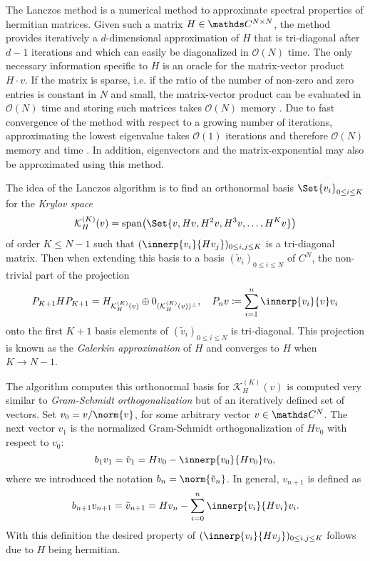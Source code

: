 The Lanczos method is a numerical method to approximate spectral properties of hermitian matrices. 
Given such a matrix \(H \in \C^{N\times N}\), the method provides iteratively a \(d\)-dimensional approximation of \(H\) that is tri-diagonal after \(d-1\) iterations and which can easily be diagonalized in \(\mathcal{O}(N)\) time.
The only necessary information specific to \(H\) is an oracle for the matrix-vector product \(H\cdot v\).
If the matrix is sparse, i.e. if the ratio of the number of non-zero and zero entries is constant in \(N\) and small, the matrix-vector product can be evaluated in \(\mathcal{O}(N)\) time and storing such matrices takes \(\mathcal{O}(N)\) memory \cite{kocherikLanczosMethod2015}. 
Due to fast convergence of the method with respect to a growing number of iterations, approximating the lowest eigenvalue takes \(\mathcal{O}(1)\) iterations and therefore \(\mathcal{O}(N)\) memory and time \cite{kocherikLanczosMethod2015}.
In addition, eigenvectors and the matrix-exponential may also be approximated using this method. 

The idea of the Lanczos algorithm is to find an orthonormal basis \(\Set{v_i}_{0\leq i \leq K}\) for the \emph{Krylov space}
\begin{equation}
    \mathcal{K}^{(K)}_H(v) = \vecspan\of*{\Set{v, Hv, H^2v, H^3v, \dots, H^K v}}
\end{equation}
of order \(K \leq N-1\) such that \((\innerp{v_i}{H v_j})_{0 \leq i,j \leq K}\) is a tri-diagonal matrix. 
Then when extending this basis to a basis \((\tilde v_i)_{0\leq i \leq N}\) of \(C^N\), the non-trivial part of the projection 
\begin{equation}
    P_{K+1} H P_{K+1} = H_{\mathcal{K}^{(K)}_H(v)} \oplus 0_{(\mathcal{K}^{(K)}_H(v))^\perp}, \quad P_n v \coloneq \sum_{i=1}^n \innerp{v_i}{v} v_i
\end{equation}
onto the first \(K+1\) basis elements of \((\tilde{v}_i)_{0\leq i \leq N}\) is tri-diagonal. 
This projection is known as the \emph{Galerkin approximation} of \(H\) and converges to \(H\) when \(K \to N-1\).

The algorithm computes this orthonormal basis for \(\mathcal{K}^{(K)}_H(v)\) is computed very similar to \emph{Gram-Schmidt orthogonalization} but of an iteratively defined set of vectors. 
Set \(v_0 = v / \norm{v}\), for some arbitrary vector \(v\in\C^N\). 
The next vector \(v_1\) is the normalized Gram-Schmidt orthogonalization of \(H v_0\) with respect to \(v_0\):
\begin{equation}
    b_1 v_1 = \tilde v_1 = H v_0 - \innerp{v_0}{H v_0} v_0
    ,
\end{equation}
where we introduced the notation \(b_n = \norm{\tilde v_n}\).
In general, \(v_{n+1}\) is defined as 
\begin{equation}
    b_{n+1} v_{n+1} = \tilde v_{n+1} = H v_n - \sum_{i=0}^n \innerp{v_i}{H v_i} v_i
    .
\end{equation}
With this definition the desired property of \((\innerp{v_i}{H v_j})_{0 \leq i,j \leq K}\) follows due to \(H\) being hermitian.

